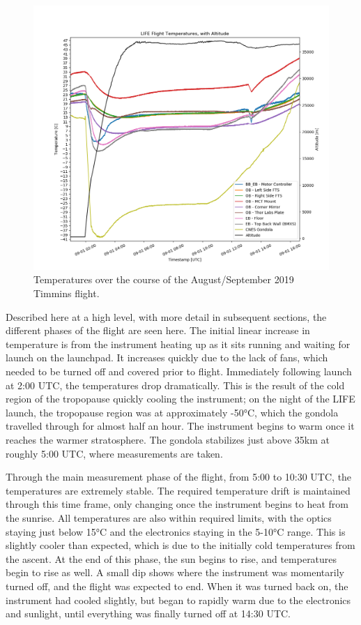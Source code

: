 \begin{figure}
    \centering
    \includegraphics[width=\textwidth]{chap4_images/full_flight_no_sim_temps.png}
    \caption{Temperatures over the course of the August/September 2019 Timmins flight.}
    \label{fig:full_temps_no_sims}
\end{figure}

Described here at a high level, with more detail in subsequent sections, the different phases of the flight are seen here. The initial linear increase in temperature is from the instrument heating up as it sits running and waiting for launch on the launchpad. It increases quickly due to the lack of fans, which needed to be turned off and covered prior to flight. Immediately following launch at 2:00 UTC, the temperatures drop dramatically. This is the result of the cold region of the tropopause quickly cooling the instrument; on the night of the LIFE launch, the tropopause region was at approximately -50°C, which the gondola travelled through for almost half an hour. The instrument begins to warm once it reaches the warmer stratosphere. The gondola stabilizes just above 35km at roughly 5:00 UTC, where measurements are taken.

Through the main measurement phase of the flight, from 5:00 to 10:30 UTC, the temperatures are extremely stable. The required temperature drift is maintained through this time frame, only changing once the instrument begins to heat from the sunrise. All temperatures are also within required limits, with the optics staying just below 15°C and the electronics staying in the 5-10°C range. This is slightly cooler than expected, which is due to the initially cold temperatures from the ascent. At the end of this phase, the sun begins to rise, and temperatures begin to rise as well. A small dip shows where the instrument was momentarily turned off, and the flight was expected to end. When it was turned back on, the instrument had cooled slightly, but began to rapidly warm due to the electronics and sunlight, until everything was finally turned off at 14:30 UTC. 

